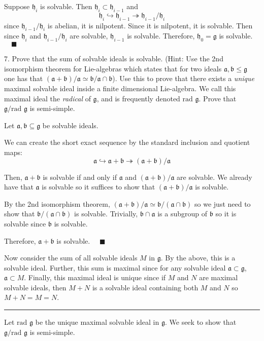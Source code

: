 \documentclass[12pt]{article}
\newcommand{\g}{\mathfrak{g}}
\newcommand{\h}{\mathfrak{h}}
\newcommand{\la}{\mathfrak{a}}
\newcommand{\lb}{\mathfrak{b}}
\newcommand{\qed}{\quad \blacksquare}
\newcommand{\rad}{\text{rad }}
\begin{document}
        Suppose $\h_i$ is solvable. Then $\h_i \subset \h_{i-1}$ and 
        \[\h_i \hookrightarrow \h_{i-1} \twoheadrightarrow \h_{i-1}/\h_i\]
        since $\h_{i-1}/\h_i$ is abelian, it is nilpotent. Since it is nilpotent, it is solvable. Then since $\h_i$ and $\h_{i-1}/\h_i$ are solvable, $\h_{i-1}$ is solvable. Therefore, $\h_0 = \g$ is solvable. $\qed$
    \color{black}


\pagebreak 

7.  Prove that the sum of solvable ideals is solvable.  (Hint:  Use the 2nd isomorphism theorem for Lie-algebras which states that for two ideals $\la, \lb \leq \g$ one has that $(\la + \lb)/\la \simeq \lb / \la \cap \lb$).  Use this to prove that there exists a \emph{unique} maximal solvable ideal inside a finite dimensional Lie-algebra.  We call this maximal ideal the \emph{radical} of $\g$, and is frequently denoted $\text{rad } \g$.  Prove that $\g / \text{rad } \g$ is semi-simple.  

    \color{blue}
        Let $\la, \lb \subseteq \g$ be solvable ideals.

        We can create the short exact sequence by the standard inclusion and quotient maps: 
        \[\la \hookrightarrow \la + \lb \twoheadrightarrow (\la + \lb)/\la\]
        
        Then, $\la + \lb$ is solvable if and only if $\la$ and $(\la + \lb)/\la$ are solvable. We already have that $\la$ is solvable so it suffices to show that $(\la + \lb)/\la$ is solvable.
        
        By the 2nd isomorphism theorem, $(\la + \lb)/\la \simeq \lb/(\la \cap \lb)$ so we just need to show that $\lb/(\la \cap \lb)$ is solvable. Trivially, $\lb \cap \la$ is a subgroup of $\lb$ so it is solvable since $\lb$ is solvable.
       
        Therefore, $\la + \lb$ is solvable. $\qed$ 

        Now consider the sum of all solvable ideals $M$ in $\g$. By the above, this is a solvable ideal. Further, this sum is maximal since for any solvable ideal $\la \subset \g$, $\la \subset M$. Finally, this maximal ideal is unique since if $M$ and $N$ are maximal solvable ideals, then $M + N$ is a solvable ideal containing both $M$ and $N$ so $M + N = M = N$.

        \vspace*{10pt}
        \hrule 
        \vspace*{10pt}

        Let $\rad \g$ be the unique maximal solvable ideal in $\g$. We seek to show that $\g/\rad \g$ is semi-simple.
\end{document}
